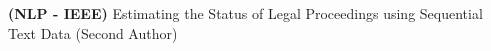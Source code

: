 \textbf{(NLP - IEEE)}{ Estimating the Status of Legal Proceedings using Sequential Text Data (Second Author)} \\
